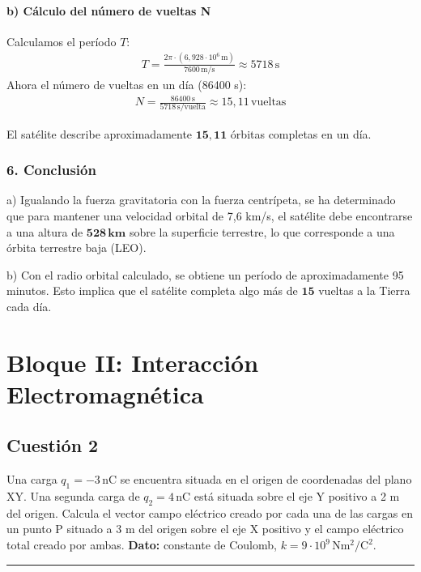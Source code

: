 \paragraph*{b) Cálculo del número de vueltas N}
Calculamos el período $T$:
\begin{gather}
    T = \frac{2\pi \cdot (6,928\cdot10^6\,\text{m})}{7600\,\text{m/s}} \approx 5718\,\text{s}
\end{gather}
Ahora el número de vueltas en un día (86400 s):
\begin{gather}
    N = \frac{86400\,\text{s}}{5718\,\text{s/vuelta}} \approx 15,11\,\text{vueltas}
\end{gather}
\begin{cajaresultado}
    El satélite describe aproximadamente $\boldsymbol{15,11}$ órbitas completas en un día.
\end{cajaresultado}

\subsubsection*{6. Conclusión}
\begin{cajaconclusion}
a) Igualando la fuerza gravitatoria con la fuerza centrípeta, se ha determinado que para mantener una velocidad orbital de 7,6 km/s, el satélite debe encontrarse a una altura de $\mathbf{528 \, km}$ sobre la superficie terrestre, lo que corresponde a una órbita terrestre baja (LEO).

b) Con el radio orbital calculado, se obtiene un período de aproximadamente 95 minutos. Esto implica que el satélite completa algo más de $\mathbf{15}$ vueltas a la Tierra cada día.
\end{cajaconclusion}

\newpage

\section{Bloque II: Interacción Electromagnética}
\label{sec:em_2020_sep_ext}

\subsection{Cuestión 2}
\label{subsec:C2_2020_sep_ext}

\begin{cajaenunciado}
Una carga $q_1 = -3\,\text{nC}$ se encuentra situada en el origen de coordenadas del plano XY. Una segunda carga de $q_2 = 4\,\text{nC}$ está situada sobre el eje Y positivo a 2 m del origen. Calcula el vector campo eléctrico creado por cada una de las cargas en un punto P situado a 3 m del origen sobre el eje X positivo y el campo eléctrico total creado por ambas.
\textbf{Dato:} constante de Coulomb, $k=9\cdot10^{9}\,\text{N}\text{m}^2/\text{C}^2$.
\end{cajaenunciado}
\hrule

